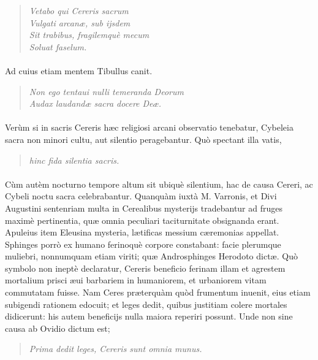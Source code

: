 \documentclass[a4paper, 11pt, oneside, polutonikogreek, latin]{article}
\begin{document}
\begin{quote}
\emph{Vetabo qui Cereris sacrum}\\
\emph{Vulgati arcanæ, sub ijsdem}\\
\emph{Sit trabibus, fragilemquè mecum}\\
\emph{Soluat faselum.}\\
\end{quote}
\vspace*{-8mm}
\paragraph{}
Ad cuius etiam mentem Tibullus canit.
\begin{quote}
\emph{Non ego tentaui nulli temeranda Deorum}\\
\hspace*{10mm}\emph{Audax laudandæ sacra docere Deæ.}\\
\end{quote}
\vspace*{-8mm}
\paragraph{}
Verùm si in sacris Cereris hæc religiosi arcani observatio tenebatur, Cybeleia sacra non minori cultu, aut silentio peragebantur. Quò spectant illa vatis,
\begin{quote}
\hspace*{15mm}\emph{hinc fida silentia sacris.}
\end{quote}
\vspace*{-4mm}
\paragraph{}
Cùm autèm nocturno tempore altum sit ubiquè silentium, hac de causa Cereri, ac Cybeli noctu sacra celebrabantur. Quanquàm iuxtà M. Varronis, et Divi Augustini sentenriam multa in Cerealibus mysterijs tradebantur ad fruges maximè pertinentia, quæ omnia peculiari taciturnitate obsignanda erant. Apuleius item Eleusina mysteria, lætificas messium cæremonias appellat. Sphinges porrò ex humano ferinoquè corpore constabant: facie plerumque muliebri, nonnumquam etiam viriti; quæ Androsphinges Herodoto dictæ. Quò symbolo non ineptè declaratur, Cereris beneficio ferinam illam et agrestem mortalium prisci æui barbariem in humaniorem, et urbaniorem vitam commutatam fuisse. Nam Ceres præterquàm quòd frumentum inuenit, eius etiam subigendi rationem edocuit; et leges dedit, quibus justitiam colere mortales didicerunt: his autem beneficijs nulla maiora reperiri possunt. Unde non sine causa ab Ovidio dictum est;
\begin{quote}
\emph{Prima dedit leges, Cereris sunt omnia munus.}
\end{quote}
\vspace*{-4mm}
\end{document}
